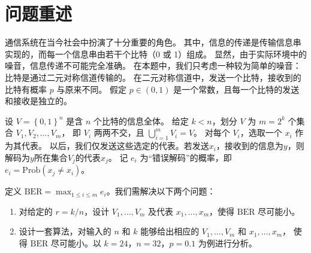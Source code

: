 \section{问题重述}

通信系统在当今社会中扮演了十分重要的角色。
其中，信息的传递是传输信息串实现的，而每一个信息串由若干个比特（0 或 1）组成。
显然，由于实际环境中的噪音，信息传递不可能完全准确。
在本题中，我们只考虑一种较为简单的噪音：比特是通过二元对称信道传输的。
在二元对称信道中，发送一个比特，接收到的比特有概率 \(p\) 与原来不同。
假定 \(p\in(0,1)\) 是一个常数，且每一个比特的发送和接收是独立的。

设 \(V=\left\{0,1\right\}^n\) 是含 \(n\) 个比特的信息全体。
给定 \(k<n\)，划分 \(V\) 为 \(m=2^k\) 个集合 \(V_1,V_2,\dots,V_m\)，
即 \(V_i\) 两两不交，且 \(\bigcup_{i=1}^m V_i=V\)。
对每个 \(V_i\)，选取一个 \(x_i\) 作为其代表。
以后，我们仅发送这些选定的代表。若发送$x_i$，接收到的信息为$y$，则解码为$y$所在集合$V_j$的代表$x_j$。
记 \(e_i\) 为“错误解码”的概率，即 \(e_i=\mathrm{Prob}\left(x_j\ne x_i\right)\)。

定义 \(\mathrm{BER}=\max_{1\le i\le m}e_i\)。我们需解决以下两个问题：
\begin{enumerate}[nosep]
  \item 对给定的 \(r=k/n\)，设计 \(V_1,\dots,V_m\) 及代表 \(x_1,\dots,x_m\)，使得 \(\mathrm{BER}\) 尽可能小。
  \item 设计一套算法，对输入的 \(n\) 和 \(k\) 能够给出相应的 \(V_1,\dots,V_m\) 和 \(x_1,\dots,x_m\)，
  使得 \(\mathrm{BER}\) 尽可能小。以 \(k=24\)，\(n=32\)，\(p=0.1\) 为例进行分析。
\end{enumerate}